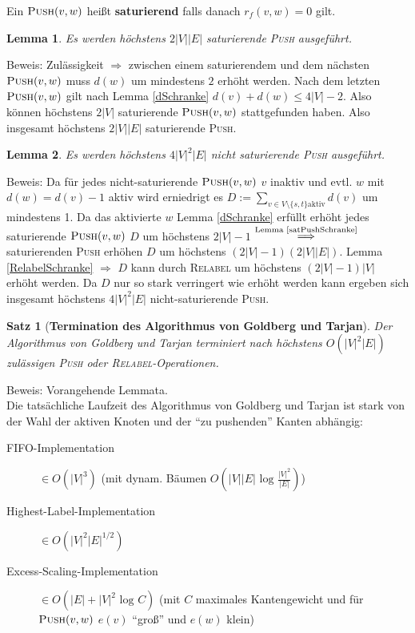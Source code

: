 \documentclass[a4paper,10pt]{scrartcl}
\newcommand{\tbf}{\textbf}
\newcommand{\tsc}{\textsc}
\newcommand{\Ra}{\Rightarrow}
\newtheorem{satz}{Satz}
\newtheorem{lemma}{Lemma}
\begin{document}
Ein $\tsc{Push}(v,w)$ heißt \tbf{saturierend} falls danach $r_f(v,w) = 0$ gilt. \\

\begin{lemma}\label{satPushSchranke}
 Es werden höchstens $2|V||E|$ saturierende \tsc{Push} ausgeführt. 
\end{lemma}

Beweis: Zulässigkeit $\Ra$ zwischen einem saturierendem und dem nächsten $\tsc{Push}(v,w)$ muss $d(w)$ um mindestens $2$ erhöht werden. Nach dem letzten $\tsc{Push}(v,w)$ gilt nach Lemma \ref{dSchranke} $d(v) + d(w) \leq 4|V| - 2$. Also können höchstens $2|V|$ saturierende $\tsc{Push}(v,w)$ stattgefunden haben. Also insgesamt höchstens $2|V||E|$ saturierende \tsc{Push}. \\

\begin{lemma}
 Es werden höchstens $4|V|^2|E|$ nicht saturierende \tsc{Push} ausgeführt. 
\end{lemma}

Beweis: Da für jedes nicht-saturierende $\tsc{Push}(v,w)$ $v$ inaktiv und evtl. $w$ mit $d(w) = d(v) - 1$ aktiv wird erniedrigt es $D := \sum_{v \in V \setminus \{s,t\} \text{aktiv}} \limits d(v)$ um mindestens 1. Da das aktivierte $w$ Lemma \ref{dSchranke} erfüllt erhöht jedes saturierende $\tsc{Push}(v,w)$ $D$ um höchstens $2|V| - 1$ $\overset{\text{Lemma \ref{satPushSchranke}}}{\Longrightarrow}$ saturierenden \tsc{Push} erhöhen $D$ um höchstens $(2|V|-1)(2|V||E|)$. Lemma \ref{RelabelSchranke} $\Ra$ $D$ kann durch \tsc{Relabel} um höchstens $(2|V|-1)|V|$ erhöht werden. Da $D$ nur so stark verringert wie erhöht werden kann ergeben sich insgesamt höchstens $4|V|^2|E|$ nicht-saturierende \tsc{Push}. \\

\begin{satz}[\tbf{Termination des Algorithmus von \textsf{Goldberg} und \textsf{Tarjan}}]
  Der Algorithmus von \textsf{Goldberg} und \textsf{Tarjan} terminiert nach höchstens $O(|V|^2|E|)$ zulässigen \tsc{Push} oder \tsc{Relabel}-Operationen.
\end{satz}

Beweis: Vorangehende Lemmata. \\

Die tatsächliche Laufzeit des Algorithmus von \textsf{Goldberg} und \textsf{Tarjan} ist stark von der Wahl der aktiven Knoten und der ``zu pushenden'' Kanten abhängig:

\begin{description}
 \item[FIFO-Implementation] $\in O(|V|^3)$ (mit dynam. Bäumen $O(|V||E| \text{ log } \frac{|V|^2}{|E|})$)
 \item[Highest-Label-Implementation] $\in O(|V|^2|E|^{1/2})$
 \item[Excess-Scaling-Implementation] $\in O(|E| + |V|^2 \text{ log } C)$ (mit $C$ maximales Kantengewicht und für $\tsc{Push}(v,w)$ $e(v)$ ``groß'' und $e(w)$ klein)
\end{description}
\end{document}

